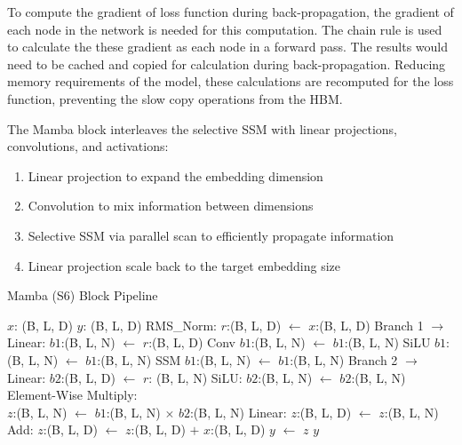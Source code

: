 \documentclass[conference]{IEEEtran}
\begin{document}
To compute the gradient of loss function during back-propagation, the gradient of each node in the network is needed for this computation. The chain rule is used to calculate the these gradient as each node in a forward pass. The results would need to be cached and copied for calculation during back-propagation. Reducing memory requirements of the model, these calculations are recomputed for the loss function, preventing the slow copy operations from the HBM.


The Mamba block interleaves the selective SSM with linear projections, convolutions, and activations:
\begin{enumerate}
    \item Linear projection to expand the embedding dimension
    \item Convolution to mix information between dimensions
    \item Selective SSM via parallel scan to efficiently propagate information
    \item Linear projection scale back to the target embedding size
\end{enumerate}

\newcommand{\INDTSTATE}[2][2em]{\STATE \hspace*{#1}#2}
\begin{algorithm}
    \caption{Mamba (S6) Block Pipeline}
    \label{s6block}
    \begin{algorithmic}[1]
        \INPUT $x$: (B, L, D)
        \OUTPUT $y$: (B, L, D)
        \STATE RMS\_Norm: $r$:(B, L, D) $\leftarrow$ $x$:(B, L, D)
        \STATE Branch 1 $\rightarrow$
            \INDTSTATE[2em]{Linear: $b1$:(B, L, N) $\leftarrow$ $r$:(B, L, D)}
            \INDTSTATE[2em]{Conv $b1$:(B, L, N) $\leftarrow$ $b1$:(B, L, N)}
            \INDTSTATE[2em]{SiLU $b1$:(B, L, N) $\leftarrow$ $b1$:(B, L, N)}
            \INDTSTATE[2em]{SSM $b1$:(B, L, N) $\leftarrow$ $b1$:(B, L, N)}
        \STATE Branch 2 $\rightarrow$
            \INDTSTATE[2em]{Linear: $b2$:(B, L, D) $\leftarrow$ $r$: (B, L, N)}
            \INDTSTATE[2em]{SiLU: $b2$:(B, L, N) $\leftarrow$ $b2$:(B, L, N)}
        \STATE Element-Wise Multiply: \\$z$:(B, L, N) $\leftarrow$ $b1$:(B, L, N) $\times$ $b2$:(B, L, N)
        \STATE Linear: $z$:(B, L, D) $\leftarrow$ $z$:(B, L, N)
        \STATE Add: $z$:(B, L, D) $\leftarrow$ $z$:(B, L, D) $+$ $x$:(B, L, D)
        \STATE $y$ $\leftarrow$ $z$
        \RETURN $y$
    \end{algorithmic}
\end{algorithm}
\end{document}
